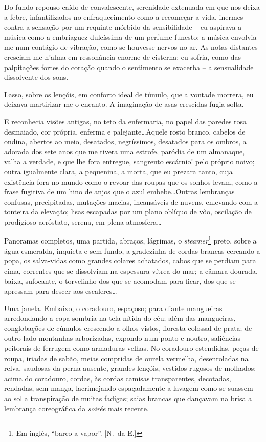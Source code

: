 Do fundo repouso caído de convalescente, serenidade extenuada em que nos deixa a
febre, infantilizados no enfraquecimento como a recomeçar a vida,
inermes contra a sensação por um requinte mórbido da sensibilidade -- 
eu aspirava a música como a embriaguez dulcíssima de um perfume
funesto; a música envolvia{}-me num contágio de vibração, como se
houvesse nervos no ar. As notas distantes cresciam{}-me n'alma em
ressonância enorme de cisterna; eu sofria, como das palpitações fortes
do coração quando o sentimento se exacerba -- a sensualidade
dissolvente dos sons. 

Lasso, sobre os lençóis, em conforto ideal de
túmulo, que a vontade morrera, eu deixava martirizar{}-me o encanto. A
imaginação de asas crescidas fugia solta. 

E reconhecia visões antigas,
no teto da enfermaria, no papel das paredes rosa desmaiado, cor
própria, enferma e palejante\ldots Aquele rosto branco, cabelos de ondina,
abertos ao meio, desatados, negríssimos, desatados para os ombros, a
adorada dos sete anos que me tivera uma estrofe, paródia
de um almanaque, valha a verdade, e que lhe fora entregue, sangrento
escárnio! pelo próprio noivo; outra igualmente clara, a pequenina, a
morta, que eu prezara tanto, cuja existência fora no mundo como o
revoar das roupas que os sonhos levam, como a frase fugitiva de um hino
de anjos que o azul embebe\ldots Outras lembranças confusas, precipitadas,
mutações macias, incansáveis de nuvens, enlevando com a tonteira da
elevação; lisas escapadas por um plano oblíquo de vôo, oscilação de
prodigioso aeróstato, serena, em plena atmosfera\ldots 

Panoramas completos, uma partida, abraços, lágrimas, o \textit{steamer}\footnote{ Em inglês, 
``barco a vapor''. [N.~da E.]} preto, sobre a
água esmeralda, inquieta e sem fundo, a gradezinha de cordas brancas
cercando a popa, os salva{}-vidas como grandes colares achatados, cabos
que se perdiam para cima, correntes que se dissolviam na espessura
vítrea do mar; a câmara dourada, baixa, sufocante, o torvelinho dos que
se acomodam para ficar, dos que se apressam para descer aos
escaleres\ldots 

Uma janela. Embaixo, o coradouro, espaçoso; para diante
mangueiras arredondando a copa sombria na tela nítida do céu; além das
mangueiras, conglobações de cúmulos crescendo a olhos vistos, floresta
colossal de prata; de outro lado montanhas arborizadas, expondo num
ponto e noutro, saliências peitorais de ferrugem como armaduras velhas.
No coradouro estendidas, peças de roupa, iriadas de sabão, meias
compridas de ourela vermelha, desenroladas na relva, saudosas da perna
ausente, grandes lençóis, vestidos rugosos de molhados; acima do
coradouro, cordas, às cordas camisas transparentes, decotadas,
rendadas, sem manga, lacrimejando espaçadamente a lavagem como se
suassem ao sol a transpiração de muitas fadigas; saias brancas que
dançavam na brisa a lembrança coreográfica da \textit{soirée} mais recente.

